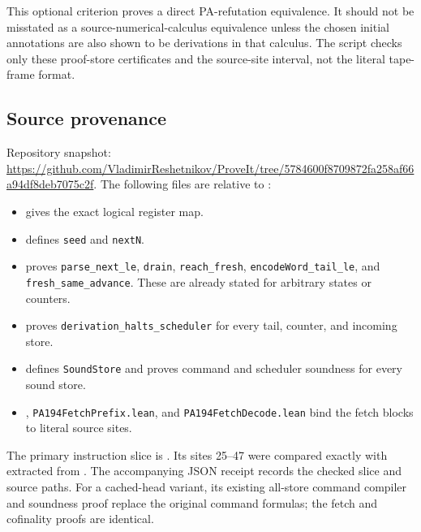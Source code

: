 This optional criterion proves a direct PA-refutation equivalence. It
should not be misstated as a source-numerical-calculus equivalence unless
the chosen initial annotations are also shown to be derivations in that
calculus. The script checks only these proof-store certificates and the
source-site interval, not the literal tape-frame format.

\subsection{Source provenance}

Repository snapshot:
\url{https://github.com/VladimirReshetnikov/ProveIt/tree/5784600f8709872fa258af66a94df8deb7075c2f}.
The following files are relative to
:
\begin{itemize}
\item {} gives the
      exact logical register map.
\item {} defines
      \texttt{seed} and \texttt{nextN}.
\item {} proves
      \texttt{parse\_next\_le}, \texttt{drain}, \texttt{reach\_fresh},
      \texttt{encodeWord\_tail\_le}, and \texttt{fresh\_same\_advance}.
      These are already stated for arbitrary states or counters.
\item {} proves
      \texttt{derivation\_halts\_scheduler} for every tail, counter,
      and incoming store.
\item {}
      defines \texttt{SoundStore} and proves command and scheduler
      soundness for every sound store.
\item {},
      \texttt{PA194FetchPrefix.lean}, and \texttt{PA194FetchDecode.lean}
      bind the fetch blocks to literal source sites.
\end{itemize}

The primary instruction slice is
.
Its sites 25--47 were compared exactly with
 extracted from
.
The accompanying JSON receipt records the checked slice and source paths.
For a cached-head variant, its existing all-store command compiler and
soundness proof replace the original command formulas; the fetch and
cofinality proofs are identical.
